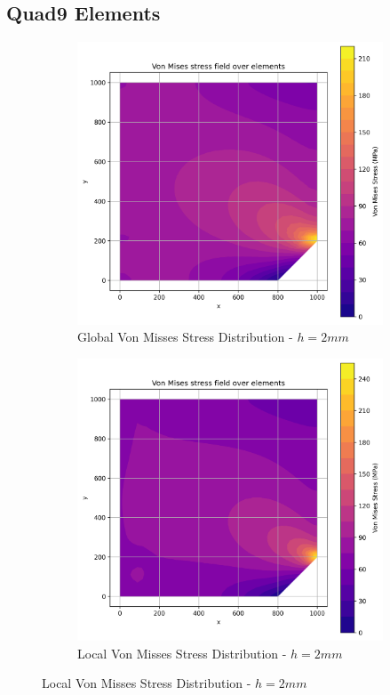 \subsection{Quad9 Elements}

\begin{figure}[H]
  \centering
  \begin{subfigure}[b]{0.45\textwidth}
    \centering
    \includegraphics[width=\textwidth]{GRAFICOS/Quad9/2mm_global/resultados_von_mises.png}
    \caption{Global Von Misses Stress Distribution - $h=2mm$}
    \label{fig:img1}
  \end{subfigure}
  \hfill
  \begin{subfigure}[b]{0.45\textwidth}
    \centering
    \includegraphics[width=\textwidth]{GRAFICOS/Quad9/2mm_local/resultados_von_mises.png}
    \caption{Local Von Misses Stress Distribution - $h=2mm$}
    \label{fig:img2}
  \end{subfigure}
\end{figure}

